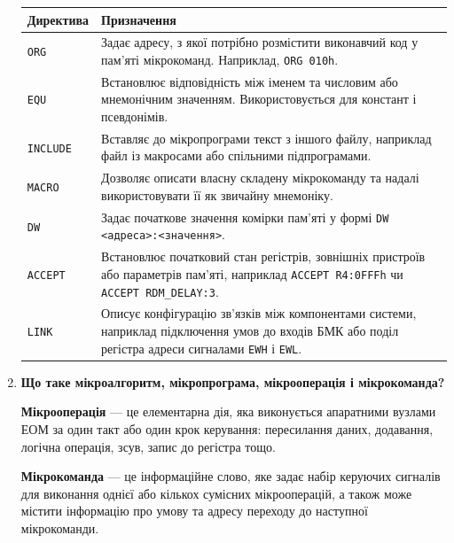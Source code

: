 \documentclass[12pt,a4paper]{article}
\begin{document}
\begin{enumerate}
        \begin{center}
        \small
        \renewcommand{\arraystretch}{1.25}
        \begin{tabular}{|C{2.8cm}|p{11.5cm}|}
            \hline
            \textbf{Директива} & \textbf{Призначення} \\
            \hline
            \texttt{ORG} & Задає адресу, з якої потрібно розмістити виконавчий код у пам'яті мікрокоманд. Наприклад, \texttt{ORG 010h}. \\
            \hline
            \texttt{EQU} & Встановлює відповідність між іменем та числовим або мнемонічним значенням. Використовується для констант і псевдонімів. \\
            \hline
            \texttt{INCLUDE} & Вставляє до мікропрограми текст з іншого файлу, наприклад файл із макросами або спільними підпрограмами. \\
            \hline
            \texttt{MACRO} & Дозволяє описати власну складену мікрокоманду та надалі використовувати її як звичайну мнемоніку. \\
            \hline
            \texttt{DW} & Задає початкове значення комірки пам'яті у формі \texttt{DW <адреса>:<значення>}. \\
            \hline
            \texttt{ACCEPT} & Встановлює початковий стан регістрів, зовнішніх пристроїв або параметрів пам'яті, наприклад \texttt{ACCEPT R4:0FFFh} чи \texttt{ACCEPT RDM\_DELAY:3}. \\
            \hline
            \texttt{LINK} & Описує конфігурацію зв'язків між компонентами системи, наприклад підключення умов до входів БМК або поділ регістра адреси сигналами \texttt{EWH} і \texttt{EWL}. \\
            \hline
        \end{tabular}
        \end{center}

        \item \textbf{Що таке мікроалгоритм, мікропрограма, мікрооперація і мікрокоманда?}

        \textbf{Мікрооперація} --- це елементарна дія, яка виконується апаратними вузлами ЕОМ за один такт або один крок керування: пересилання даних, додавання, логічна операція, зсув, запис до регістра тощо.

        \textbf{Мікрокоманда} --- це інформаційне слово, яке задає набір керуючих сигналів для виконання однієї або кількох сумісних мікрооперацій, а також може містити інформацію про умову та адресу переходу до наступної мікрокоманди.


\end{enumerate}
\end{document}
